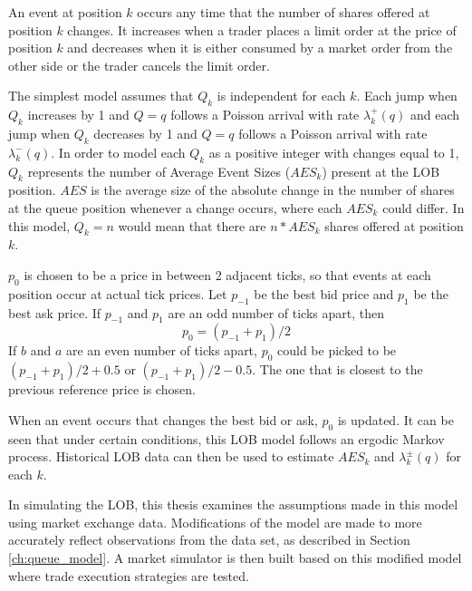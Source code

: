 An event at position $k$ occurs any time that the number of shares offered at position $k$ changes. It increases when a trader places a limit order at the price of position $k$ and decreases when it is either consumed by a market order from the other side or the trader cancels the limit order.

The simplest model assumes that $Q_k$ is independent for each $k$. Each jump when $Q_k$ increases by 1 and $Q = q$ follows a Poisson arrival with rate $\lambda^+_k(q)$ and each jump when $Q_k$ decreases by 1 and $Q = q$ follows a Poisson arrival with rate $\lambda^-_k(q)$. In order to model each $Q_k$ as a positive integer with changes equal to 1, $Q_k$ represents the number of Average Event Sizes ($AES_k$) present at the LOB position. $AES$ is the average size of the absolute change in the number of shares at the queue position whenever a change occurs, where each $AES_k$ could differ. In this model, $Q_k = n$ would mean that there are $n*AES_k$ shares offered at position $k$.

$p_0$ is chosen to be a price in between 2 adjacent ticks, so that events at each position occur at actual tick prices. Let $p_{-1}$ be the best bid price and $p_1$ be the best ask price. If $p_{-1}$ and $p_1$ are an odd number of ticks apart, then 
$$p_0=  (p_{-1}+p_1)/2$$
If $b$ and $a$ are an even number of ticks apart, $p_0$ could be picked to be $(p_{-1}+p_1)/2 + 0.5$ or $(p_{-1}+p_1)/2 - 0.5$. The one that is closest to the previous reference price is chosen.

When an event occurs that changes the best bid or ask, $p_0$ is updated. It can be seen that under certain conditions, this LOB model follows an ergodic Markov process. Historical LOB data can then be used to estimate $AES_k$ and $\lambda^{\pm}_k(q)$ for each $k$.

In simulating the LOB, this thesis examines the assumptions made in this model using market exchange data. Modifications of the model are made to more accurately reflect observations from the data set, as described in Section \ref{ch:queue_model}. A market simulator is then built based on this modified model where trade execution strategies are tested.